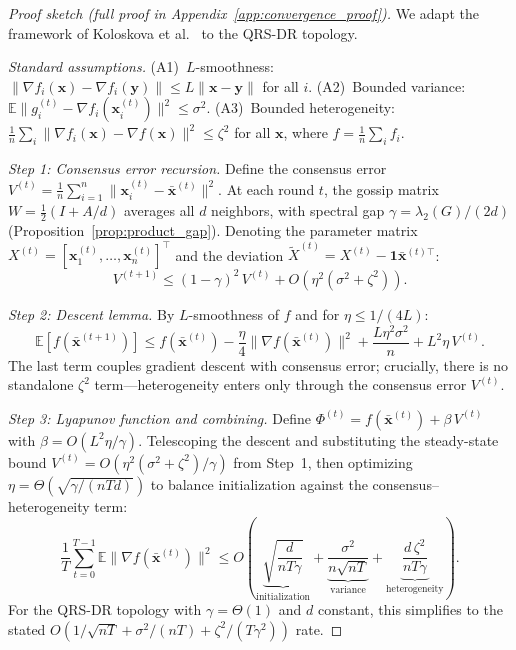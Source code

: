 \documentclass{article}
\newcommand{\E}{\mathbb{E}}
\newcommand{\bx}{\mathbf{x}}
\newcommand{\lam}{\lambda_2}
\begin{document}
\begin{proof}[Proof sketch (full proof in Appendix~\ref{app:convergence_proof})]
We adapt the framework of Koloskova et al.~\cite{koloskova2020unified}
to the QRS-DR topology.

\emph{Standard assumptions.}
(A1)~$L$-smoothness: $\|\nabla f_i(\bx) - \nabla f_i(\mathbf{y})\|
\le L\|\bx - \mathbf{y}\|$ for all $i$.
(A2)~Bounded variance: $\E\|g_i^{(t)} - \nabla f_i(\bx_i^{(t)})\|^2
\le \sigma^2$.
(A3)~Bounded heterogeneity: $\frac{1}{n}\sum_i \|\nabla f_i(\bx)
- \nabla f(\bx)\|^2 \le \zeta^2$ for all $\bx$, where
$f = \frac{1}{n}\sum_i f_i$.

\emph{Step 1: Consensus error recursion.}
Define the consensus error $V^{(t)} = \frac{1}{n}\sum_{i=1}^n
\|\bx_i^{(t)} - \bar{\bx}^{(t)}\|^2$.
At each round $t$, the gossip matrix
$W = \frac{1}{2}(I + A/d)$ averages all $d$ neighbors, with spectral
gap $\gamma = \lam(G)/(2d)$ (Proposition~\ref{prop:product_gap}).
Denoting the parameter matrix
$X^{(t)} = [\bx_1^{(t)},\ldots,\bx_n^{(t)}]^\top$ and the
deviation $\tilde{X}^{(t)} = X^{(t)} - \mathbf{1}\bar{\bx}^{(t)\top}$:
\[
V^{(t+1)} \le (1-\gamma)^2 \, V^{(t)} + O(\eta^2(\sigma^2 + \zeta^2)).
\]

\emph{Step 2: Descent lemma.}
By $L$-smoothness of $f$ and for $\eta \le 1/(4L)$:
\[
\E[f(\bar{\bx}^{(t+1)})] \le f(\bar{\bx}^{(t)})
- \frac{\eta}{4}\|\nabla f(\bar{\bx}^{(t)})\|^2
+ \frac{L\eta^2\sigma^2}{n} + L^2\eta\, V^{(t)}.
\]
The last term couples gradient descent with consensus error;
crucially, there is no standalone $\zeta^2$ term---heterogeneity
enters only through the consensus error $V^{(t)}$.

\emph{Step 3: Lyapunov function and combining.}
Define $\Phi^{(t)} = f(\bar{\bx}^{(t)}) + \beta\, V^{(t)}$ with
$\beta = O(L^2\eta/\gamma)$.  Telescoping the descent and substituting
the steady-state bound $V^{(t)} = O(\eta^2(\sigma^2+\zeta^2)/\gamma)$
from Step~1, then optimizing $\eta = \Theta(\sqrt{\gamma/(nTd)})$
to balance initialization against the consensus--heterogeneity term:
\[
\frac{1}{T}\sum_{t=0}^{T-1}\E\|\nabla f(\bar{\bx}^{(t)})\|^2
\le O\!\left(
\underbrace{\sqrt{\frac{d}{nT\gamma}}}_{\text{initialization}}
+ \underbrace{\frac{\sigma^2}{n\sqrt{nT}}}_{\text{variance}}
+ \underbrace{\frac{d\,\zeta^2}{nT\gamma}}_{\text{heterogeneity}}\right).
\]
For the QRS-DR topology with $\gamma = \Theta(1)$ and $d$ constant,
this simplifies to the stated $O(1/\sqrt{nT} + \sigma^2/(nT)
+ \zeta^2/(T\gamma^2))$ rate.
\end{proof}
\end{document}
